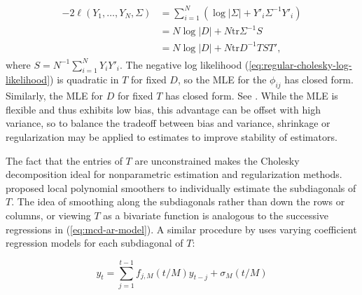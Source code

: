 \begin{align}
\begin{split} \label{eq:regular-cholesky-log-likelihood}
-2\ell\left(Y_1,\dots, Y_N, \Sigma\right) &= \sum_{i = 1}^N \left( \log \vert \Sigma \vert  + Y'_i \Sigma^{-1}Y'_i\right) \\
&= N \log \vert D \vert + N \mbox{tr}\Sigma^{-1}S \\
& = N \log \vert D \vert + N \mbox{tr}D^{-1}TST', 
\end{split}
\end{align}
\noindent
where $S = N^{-1}\sum_{i=1}^N Y_iY'_i$. The negative log likelihood (\ref{eq:regular-cholesky-log-likelihood}) is quadratic in $T$ for fixed $D$, so the MLE for the $\phi_{ij}$ has closed form. Similarly, the MLE for $D$ for fixed $T$ has closed form. See \cite{pourahmadi2000maximum}.  While the MLE is flexible and thus exhibits low bias, this advantage can be offset with high variance, so to balance the tradeoff between bias and variance, shrinkage or regularization may be applied to estimates to improve stability of estimators.  

\bigskip

The fact that the entries of $T$ are unconstrained makes the Cholesky decomposition ideal for nonparametric estimation and regularization methods. \cite{wu2003nonparametric} proposed local polynomial smoothers to individually estimate the subdiagonals of $T$. The idea of smoothing along the subdiagonals rather than down the rows or columns, or viewing $T$ as a bivariate function is analogous to the successive regressions in (\ref{eq:mcd-ar-model}). A similar procedure by \cite{dahlhaus1997fitting} uses varying coefficient regression models for each subdiagonal of $T$:

\[
y_t = \sum_{j = 1}^{t-1} f_{j,M}\left( t/M \right) y_{t-j} + \sigma_M\left(t/M\right)
\]

